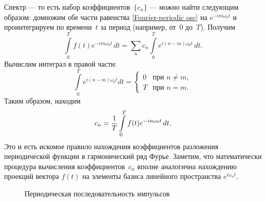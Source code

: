 Спектр --- то есть набор коэффициентов~$\{c_n\}$ ---
можно найти следующим образом: домножим обе части равенства
\eqref{Fourier-periodic osc} на $e^{-im\omega_0 t}$ и
проинтегрируем по времени~$t$ за период (например, от~$0$ до~$T$). Получим
\begin{equation*}
    \int\limits_{0}^{T} f(t)e^{-im\omega_0t}\,dt=\sum_n c_n\int\limits_{0}^{T}
e^{i(n-m)\omega_0 t}\,dt.
\end{equation*}
Вычислим интеграл в правой части:
\begin{equation*}
    \int\limits_{0}^{T}e^{i(n-m)\omega_0 t}dt =
    \begin{cases}
        0 & \text{при~}n\ne m,\\
        T & \text{при~}n = m.
    \end{cases}
\end{equation*}
Таким образом, находим
\begin{equation}
    \eqmark{fourier-coeff}
    c_n=\frac{1}{T}\int\limits_{0}^{T} f(t)e^{-in\omega_0 t}\,dt.
\end{equation}
Это и есть искомое правило нахождения коэффициентов разложения периодической
функции в гармонический ряд Фурье. Заметим, что математически процедура вычисления 
коэффициентов~$c_n$ вполне аналогична нахождению проекций 
вектора $f(t)$ на элементы базиса линейного пространства $e^{i\omega_n t}$.


\begin{wrapfigure}[10]{o}{0.5\textwidth}
    \centering
    \caption{Периодическая последовательность импульсов}
\end{wrapfigure}

